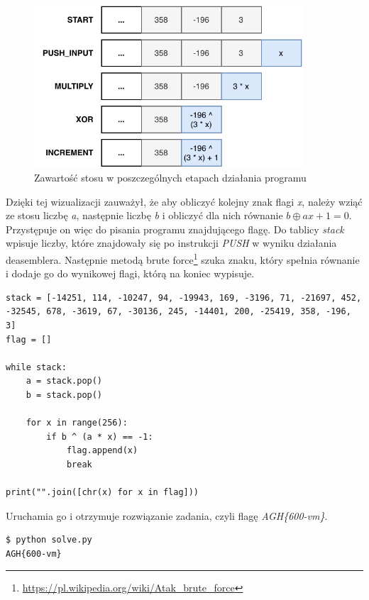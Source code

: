 \documentclass[language=polish,type=eng]{aghmodern}
\begin{document}
\begin{appendices}
\begin{figure}[H]
\centering
\includegraphics[width=10cm]{600_stack}
\caption{Zawartość stosu w poszczególnych etapach działania programu}
\label{fig:600_stack}
\end{figure}

Dzięki tej wizualizacji zauważył, że aby obliczyć kolejny znak flagi \emph{x},
należy wziąć ze stosu liczbę \emph{a}, następnie liczbę \emph{b}
i obliczyć dla nich równanie \(b \oplus ax + 1 = 0\).
Przystępuje on więc do pisania programu znajdującego flagę.
Do tablicy \emph{stack} wpisuje liczby, które znajdowały się po instrukcji
\emph{PUSH} w wyniku działania deasemblera. Następnie metodą brute force\footnote{
\url{https://pl.wikipedia.org/wiki/Atak_brute_force}} szuka znaku, który spełnia
równanie i dodaje go do wynikowej flagi, którą na koniec wypisuje.

\begin{verbatim}
stack = [-14251, 114, -10247, 94, -19943, 169, -3196, 71, -21697, 452, -32545, 678, -3619, 67, -30136, 245, -14401, 200, -25419, 358, -196, 3]
flag = []

while stack:
    a = stack.pop()
    b = stack.pop()

    for x in range(256):
        if b ^ (a * x) == -1:
            flag.append(x)
            break

print("".join([chr(x) for x in flag]))
\end{verbatim}

Uruchamia go i otrzymuje rozwiązanie zadania, czyli flagę \emph{AGH\{600-vm\}}.

\begin{verbatim}
$ python solve.py
AGH{600-vm}
\end{verbatim}

\end{appendices}

\backmatter

\cleardoublepage
\listoffigures

\end{document}
